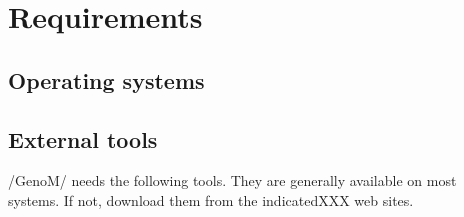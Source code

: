 %
%
%
%
%
%
%


\section{Requirements}
\label{sec|configuration|requirements}

\subsection{Operating systems}


\subsection{External tools}

/GenoM/ needs the following tools.
They are generally available on most systems. If not, download
them from the indicatedXXX web sites. 

